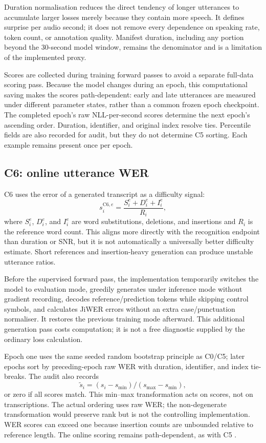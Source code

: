 \documentclass[12pt,a4paper]{report}
\begin{document}
Duration normalisation reduces the direct tendency of longer utterances to accumulate larger losses merely because they contain more speech. It defines surprise per audio second; it does not remove every dependence on speaking rate, token count, or annotation quality. Manifest duration, including any portion beyond the 30-second model window, remains the denominator and is a limitation of the implemented proxy.

Scores are collected during training forward passes to avoid a separate full-data scoring pass. Because the model changes during an epoch, this computational saving makes the scores path-dependent: early and late utterances are measured under different parameter states, rather than a common frozen epoch checkpoint. The completed epoch's raw NLL-per-second scores determine the next epoch's ascending order. Duration, identifier, and original index resolve ties. Percentile fields are also recorded for audit, but they do not determine C5 sorting. Each example remains present once per epoch.

\subsection{C6: online utterance WER}

C6 uses the error of a generated transcript as a difficulty signal:
\begin{equation}s_i^{\mathrm{C6},e}=\frac{S_i^e+D_i^e+I_i^e}{R_i},\end{equation}
where $S_i^e$, $D_i^e$, and $I_i^e$ are word substitutions, deletions, and insertions and $R_i$ is the reference word count. This aligns more directly with the recognition endpoint than duration or SNR, but it is not automatically a universally better difficulty estimate. Short references and insertion-heavy generation can produce unstable utterance ratios.

Before the supervised forward pass, the implementation temporarily switches the model to evaluation mode, greedily generates under inference mode without gradient recording, decodes reference/prediction tokens while skipping control symbols, and calculates JiWER errors without an extra case/punctuation normaliser. It restores the previous training mode afterward. This additional generation pass costs computation; it is not a free diagnostic supplied by the ordinary loss calculation.

Epoch one uses the same seeded random bootstrap principle as C0/C5; later epochs sort by preceding-epoch raw WER with duration, identifier, and index tie-breaks. The audit also records
\begin{equation}\widetilde{s}_i=(s_i-s_{\min})/(s_{\max}-s_{\min}),\end{equation}
or zero if all scores match. This min--max transformation acts on scores, not on transcriptions. The actual ordering uses raw WER; the non-degenerate transformation would preserve rank but is not the controlling implementation. WER scores can exceed one because insertion counts are unbounded relative to reference length. The online scoring remains path-dependent, as with C5 \citep{Karakasidis2022}.
\end{document}

